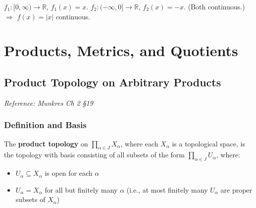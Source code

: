 \documentclass[11pt]{report}
\begin{document}
\begin{exbox}
$f_1: [0, \infty) \to \mathbb{R}$, $f_1(x) = x$. $f_2: (-\infty, 0] \to \mathbb{R}$, $f_2(x) = -x$. (Both continuous.) $\Rightarrow$ $f(x) = |x|$ continuous.
\end{exbox}

\chapter{Products, Metrics, and Quotients}

\section{Product Topology on Arbitrary Products}

\textit{Reference: Munkres Ch 2 \S 19}

\subsection{Definition and Basis}

\begin{defbox}
The \textbf{product topology} on $\prod_{\alpha \in J} X_\alpha$, where each $X_\alpha$ is a topological space, is the topology with basis consisting of all subsets of the form $\prod_{\alpha \in J} U_\alpha$, where:
\begin{itemize}
    \item $U_\alpha \subseteq X_\alpha$ is open for each $\alpha$
    \item $U_\alpha = X_\alpha$ for all but finitely many $\alpha$ (i.e., at most finitely many $U_\alpha$ are proper subsets of $X_\alpha$)
\end{itemize}
\end{defbox}
\end{document}
